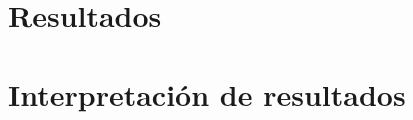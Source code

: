 \documentclass[12pt,letterpaper]{article}
\begin{document}









\section{Resultados}





\section{Interpretación de resultados}




\end{document}
